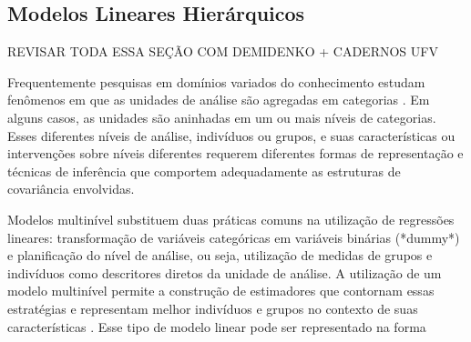 \documentclass[12pt, a4paper, twoside]{report}
\numberwithin{equation}{subsection} %
\begin{document}
\subsection{Modelos Lineares Hierárquicos}

REVISAR TODA ESSA SEÇÃO COM DEMIDENKO + CADERNOS UFV

Frequentemente pesquisas em domínios variados do conhecimento estudam fenômenos em que as unidades de análise são agregadas em categorias \citep{adewale2007understanding, mcmahon2007scales}. Em alguns casos, as unidades são aninhadas em um ou mais níveis de categorias. Esses diferentes níveis de análise, indivíduos ou grupos, e suas características ou intervenções sobre níveis diferentes requerem diferentes formas de representação e técnicas de inferência que comportem adequadamente as estruturas de covariância envolvidas.

Modelos multinível substituem duas práticas comuns na utilização de regressões lineares: transformação de variáveis categóricas em variáveis binárias (*dummy*) e planificação do nível de análise, ou seja, utilização de medidas de grupos e indivíduos como descritores diretos da unidade de análise. A utilização de um modelo multinível permite a construção de estimadores que contornam essas estratégias e representam melhor indivíduos e grupos no contexto de suas características \citep{hox2017multilevel, gelman_hill_2007}. Esse tipo de modelo linear pode ser representado na forma
\end{document}
